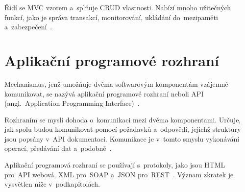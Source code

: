 \documentclass[twoside]{ctuthesis}
\begin{document}
Řídí se MVC vzorem a~splňuje CRUD vlastnosti. Nabízí mnoho užitečných funkcí, jako je správa transakcí, monitorování, ukládání do~mezipaměti a~zabezpečení~\cite{frameworks}.

%
%
%
\section{Aplikační programové rozhraní}

Mechanismus, jenž umožňuje dvěma softwarovým komponentám vzájemně komunikovat, se nazývá aplikační programové rozhraní neboli API (angl.~Application Programming Interface)~\cite{aws}.

Rozhraním se myslí dohoda o~komunikaci mezi dvěma komponentami. Určuje, jak spolu budou komunikovat pomocí požadavků a~odpovědí, jejichž struktury jsou popsány v~API dokumentaci. Komunikace je v~tomto smyslu vykonávání operací, předávání dat a~podobně~\cite{aws}.

Aplikační programová rozhraní se používají s~protokoly, jako jsou HTML pro~API webová, XML pro~SOAP a~JSON pro~REST~\cite{mediumapi}. Význam zkratek je vysvětlen níže v~podkapitolách.
%
\end{document}
